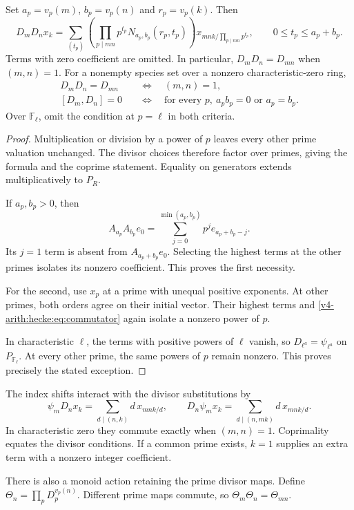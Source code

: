 \begin{corollary}
\label{v4-arith:hecke:cor:global}
Set $a_p=v_p(m)$, $b_p=v_p(n)$ and $r_p=v_p(k)$.
Then
\[
 D_mD_nx_k=
 \sum_{(t_p)}\left(\prod_{p\mid mn}p^{t_p}
 N_{a_p,b_p}(r_p,t_p)\right)
 x_{mnk/\prod_{p\mid mn}p^{t_p}},
 \qquad 0\leq t_p\leq a_p+b_p.
\]
Terms with zero coefficient are omitted.
In particular, $D_mD_n=D_{mn}$ when $(m,n)=1$.
For a nonempty species set over a nonzero characteristic-zero ring,
\begin{align*}
 D_mD_n=D_{mn}&\quad\Longleftrightarrow\quad(m,n)=1,\\
 [D_m,D_n]=0&\quad\Longleftrightarrow\quad
 \text{for every }p,\ a_pb_p=0\text{ or }a_p=b_p.
\end{align*}
Over $\mathbb F_\ell$, omit the condition at $p=\ell$ in both criteria.
\end{corollary}
\begin{proof}
Multiplication or division by a power of $p$ leaves every other
prime valuation unchanged. The divisor choices therefore factor
over primes, giving the formula and the coprime statement.
Equality on generators extends multiplicatively to $P_R$.

If $a_p,b_p>0$, then
\[
 A_{a_p}A_{b_p}e_0
 =\sum_{j=0}^{\min(a_p,b_p)}p^je_{a_p+b_p-j}.
\]
Its $j=1$ term is absent from $A_{a_p+b_p}e_0$.
Selecting the highest terms at the other primes isolates its
nonzero coefficient. This proves the first necessity.

For the second, use $x_p$ at a prime with unequal positive exponents.
At other primes, both orders agree on their initial vector.
Their highest terms and \eqref{v4-arith:hecke:eq:commutator}
again isolate a nonzero power of $p$.

In characteristic $\ell$, the terms with positive powers of $\ell$
vanish, so $D_{\ell^a}=\psi_{\ell^a}$ on $P_{\mathbb F_\ell}$.
At every other prime, the same powers of $p$ remain nonzero.
This proves precisely the stated exception.
\end{proof}

The index shifts interact with the divisor substitutions by
\[
 \psi_mD_nx_k=\sum_{d\mid(n,k)}d\,x_{mnk/d},\qquad
 D_n\psi_mx_k=\sum_{d\mid(n,mk)}d\,x_{mnk/d}.
\]
In characteristic zero they commute exactly when $(m,n)=1$.
Coprimality equates the divisor conditions. If a common prime exists,
$k=1$ supplies an extra term with a nonzero integer coefficient.

There is also a monoid action retaining the prime divisor maps.
Define $\Theta_n=\prod_pD_p^{v_p(n)}$.
Different prime maps commute, so $\Theta_m\Theta_n=\Theta_{mn}$.

